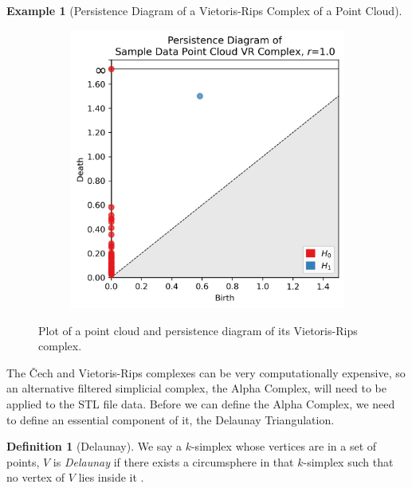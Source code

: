 \documentclass[ma]{uncgdissertationexp}
\theoremstyle{plain}
\theoremstyle{definition}
\newtheorem{definition}[theorem]{Definition}
\newtheorem{example}[theorem]{Example}
\theoremstyle{remark}
\begin{document}
\begin{example}[Persistence Diagram of a Vietoris-Rips Complex of a Point Cloud]
\begin{figure}[H]
\begin{subfigure}[b]{0.45\textwidth}
        \includegraphics[width=\textwidth]{point_cloud_persdia_vr1_0.png}
    \end{subfigure}
    \caption{Plot of a point cloud and persistence diagram of its Vietoris-Rips complex.}
    \label{fig:point_cloud_persdia}
\end{figure}
\end{example}

\newpage
\par The Čech and Vietoris-Rips complexes can be very computationally expensive, so an alternative filtered simplicial complex, the Alpha Complex, will need to be applied to the STL file data. Before we can define the Alpha Complex, we need to define an essential component of it, the Delaunay Triangulation.

\begin{definition}[Delaunay] We say a $k$-simplex whose vertices are in a set of points, $V$ is \textit{Delaunay} if there exists a circumsphere in that $k$-simplex such that no vertex of $V$ lies inside it \cite{tetgen}.
\end{definition}
\end{document}
